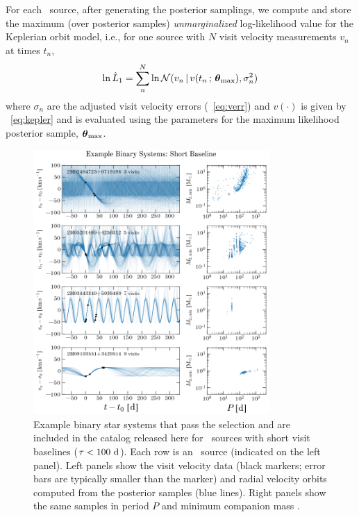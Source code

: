 \documentclass[modern]{aastex63}
\begin{document}
For each \apogee\ source, after generating the posterior samplings, we compute
and store the maximum (over posterior samples) \emph{unmarginalized}
log-likelihood value for the Keplerian orbit model, i.e., for one source with
$N$ visit velocity measurements $v_n$ at times $t_n$,
\begin{equation}
    \ln \hat{L}_1 = \sum_n^N \ln \mathcal{N}(v_n \given
        v(t_n \,;\, \bs{\theta}_{\mathrm{max}}), \sigma_n^2)
\end{equation}
where $\sigma_n$ are the adjusted visit velocity errors
(\equationname~\ref{eq:verr}) and $v(\cdot)$ is given by
\equationname~\ref{eq:kepler} and is evaluated using the parameters for the
maximum likelihood posterior sample, $\boldsymbol{\theta}_{\mathrm{max}}$.

\begin{figure}[!t]
    \begin{center}
    \includegraphics[width=0.8\textwidth]{example-binaries-short-placeholder.png}
    \end{center}
    \caption{%
    Example binary star systems that pass the selection and are included in the
    catalog released here for \apogee\ sources with short visit baselines
    ($\tau < 100~\mathrm{d}$).
    Each row is an \apogee\ source (indicated on the left panel).
    Left panels show the visit velocity data (black markers; error bars are
    typically smaller than the marker) and radial velocity orbits computed from
    the posterior samples (blue lines).
    Right panels show the same samples in period $P$ and minimum companion mass
    \mtwomin.
    \label{fig:binary-examples-short}
    }
\end{figure}
\end{document}
